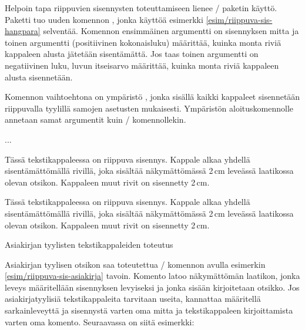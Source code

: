 Helpoin tapa riippuvien sisennysten toteuttamiseen lienee
\-/ paketin käyttö. Paketti tuo uuden
komennon , jonka käyttöä esimerkki
\ref{esim/riippuva-sis-hangpara} selventää. Komennon ensimmäinen
argumentti on sisennyksen mitta ja toinen argumentti (positiivinen
kokonaisluku) määrittää, kuinka monta riviä kappaleen alusta jätetään
sisentämättä. Jos taas toinen argumentti on negatiivinen luku, luvun
itseisarvo määrittää, kuinka monta riviä kappaleen alusta sisennetään.

Komennon  vaihtoehtona on ympäristö
, jonka sisällä kaikki kappaleet sisennetään
riippuvalla tyylillä samojen asetusten mukaisesti. Ympäristön
aloituskomennolle annetaan samat argumentit kuin \-/
komennollekin.

\begin{koodilohkosis}
\begin{hangparas}{2cm}{1}
  ...
\end{hangparas}
\end{koodilohkosis}

\begin{esimerkki*}
  \komentoi{,}

\begin{koodilohko}
Tässä tekstikappaleessa on
riippuva sisennys. Kappale alkaa yhdellä sisentämättömällä rivillä,
joka sisältää näkymättömässä 2\,cm leveässä laatikossa olevan otsikon.
Kappaleen muut rivit on sisennetty 2\,cm.
\end{koodilohko}
  \begin{tulos}
    Tässä tekstikappaleessa on
    riippuva sisennys. Kappale alkaa yhdellä sisentämättömällä rivillä,
    joka sisältää näkymättömässä 2\,cm leveässä laatikossa olevan otsikon.
    Kappaleen muut rivit on sisennetty 2\,cm.
  \end{tulos}
  \caption{Asiakirjan tyylisten tekstikappaleiden toteutus}
  \label{esim/riippuva-sis-asiakirja}
\end{esimerkki*}

Asiakirjan tyylisen otsikon saa toteutettua \-/
komennon avulla esimerkin \ref{esim/riippuva-sis-asiakirja} tavoin.
Komento latoo näkymättömän laatikon, jonka leveys määritellään
sisennyksen levyiseksi ja jonka sisään kirjoitetaan otsikko. Jos
asiakirjatyylisiä tekstikappaleita tarvitaan useita, kannattaa
määritellä sarkainleveyttä ja sisennystä varten oma mitta ja
tekstikappaleen kirjoittamista varten oma komento. Seuraavassa on siitä
esimerkki:

